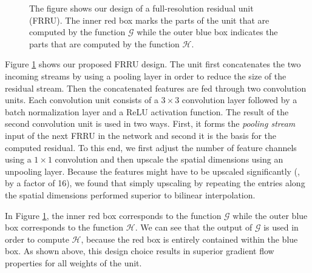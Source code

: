 \documentclass[10pt,twocolumn,letterpaper]{article}
\begin{document}
\begin{figure}[t]
{
}
\caption{The figure shows our design of a full-resolution residual unit (FRRU).
The inner red box marks the parts of the unit that are computed by the function $\mathcal{G}$ while the outer blue box indicates the parts that are computed by the function $\mathcal{H}$.
}
\label{fig:frru}
\end{figure}

Figure \ref{fig:frru} shows our proposed FRRU design.
The unit first concatenates the two incoming streams by using a pooling layer in order to reduce the size of the residual stream.
Then the concatenated features are fed through two convolution units.
Each convolution unit consists of a $3\times3$ convolution layer followed by a batch normalization layer \cite{Ioffe15ICML} and a ReLU activation function.
The result of the second convolution unit is used in two ways.
First, it forms the \emph{pooling stream} input of the next FRRU in the network and second it is the basis for the computed residual.
To this end, we first adjust the number of feature channels using a $1 \times 1$ convolution and then upscale the spatial dimensions using an unpooling layer.
Because the features might have to be upscaled significantly (\eg, by a factor of 16), we found that simply upscaling by repeating the entries along the spatial dimensions performed superior to bilinear interpolation.

In Figure \ref{fig:frru}, the inner red box corresponds to the function $\mathcal{G}$ while the outer blue box corresponds to the function $\mathcal{H}$.
We can see that the output of $\mathcal{G}$ is used in order to compute $\mathcal{H}$, because the red box is entirely contained within the blue box.
As shown above, this design choice results in superior gradient flow properties for all weights of the unit.
\end{document}
